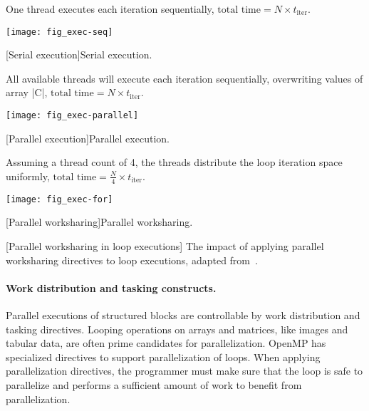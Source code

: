 \begin{center}
\begin{minipage}{\textwidth}
One thread executes each iteration sequentially, \(\text{total time} = N \times t_\text{iter}\).
\begin{center}
\begin{minipage}{.45\textwidth}
\end{minipage}\hfill%
\begin{minipage}{.45\textwidth}
\hfill\texttt{[image: fig\_exec-seq]}
\end{minipage}
[Serial execution]{Serial execution.}
\label{lst:serial}
\end{center}
All available threads will execute each iteration sequentially, overwriting values of array \pr|C|, \(\text{total time} = N \times t_\text{iter}\).
\begin{center}
\begin{minipage}{.45\textwidth}
\end{minipage}\hfill%
\begin{minipage}{.45\textwidth}
\hfill\texttt{[image: fig\_exec-parallel]}
\end{minipage}
[Parallel execution]{Parallel execution.}
\label{lst:just-parallel}
\end{center}
Assuming a thread count of 4, the threads distribute the loop iteration space uniformly, \(\text{total time} = \frac{N}{4} \times t_\text{iter}\).
\begin{center}
\begin{minipage}{.45\textwidth}
\end{minipage}\hfill
\begin{minipage}{.45\textwidth}
\hfill\texttt{[image: fig\_exec-for]}
\end{minipage}
[Parallel worksharing]{Parallel worksharing.}
\label{lst:parallel-for}
\end{center}
[Parallel worksharing in loop executions]
{The impact of applying parallel worksharing directives to loop executions, adapted from~\textcite{oak-slides}.}
\label{fig:parallel-for}
\end{minipage}
\end{center}

\paragraph*{Work distribution and tasking constructs.}
Parallel executions of structured blocks are controllable by work distribution and tasking directives.
Looping operations on arrays and matrices, like images and tabular data, are often prime candidates for parallelization.
OpenMP has specialized directives to support parallelization of loops.
When applying parallelization directives, the programmer must make sure that the loop is safe to parallelize and performs a sufficient amount of work to benefit from parallelization.

